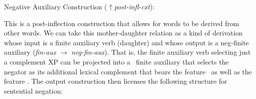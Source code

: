 \documentclass[output=paper]{langsci/langscibook}
\begin{document}
\be
\ex \label{neg-rule} Negative Auxiliary Construction ($\uparrow${\it post-infl-cxt}): \\ \small{}

\ee

%
This is a post-inflection construction that allows for words to
be derived from other words. We can take this mother-daughter relation as a kind of derivation whose input is a finite auxiliary verb (daughter)
and whose output is a neg-finite auxiliary ({\it fin-aux} $\rightarrow$ {\it neg-fin-aux}). That is, the finite auxiliary verb selecting just a
complement XP can be projected into a \NEG\ finite auxiliary that selects the negator
as its additional lexical complement that bears the feature \NEG\ as well
as the feature \LEX.
%
%
The output construction then licenses the following structure for
sentential negation:
\end{document}
